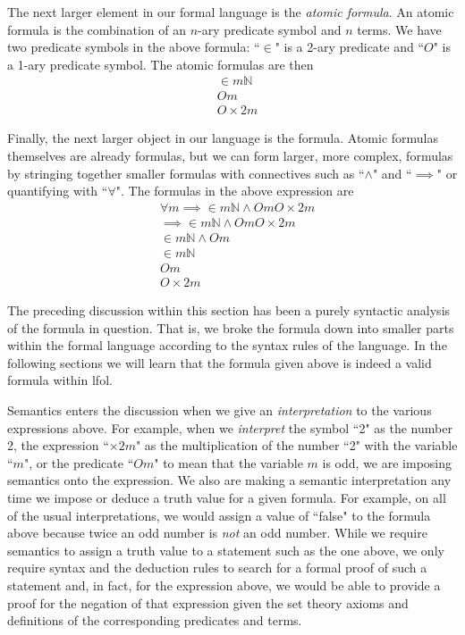 \documentclass[oneside, 12pt]{book}
\theoremstyle{break}
\newtheorem{preformal definition}[definition]{Preformal Definition}
\newtheorem{preformal theorem}[theorem]{Preformal Theorem}
\newcommand{\qq}[1]{``#1"}
\begin{document}
			The next larger element in our formal language is the \textit{atomic formula}.
			An atomic formula is the combination of an $n$-ary predicate symbol and $n$ terms.
			We have two predicate symbols in the above formula: \qq{$\in$} is a 2-ary predicate and \qq{$O$} is a 1-ary predicate symbol.
			The atomic formulas are then
			\begin{align*}
				&\in m \mathbb{N}\\
				&Om\\
				&O\times 2 m
			\end{align*}
			
			Finally, the next larger object in our language is the formula.
			Atomic formulas themselves are already formulas, but we can form larger, more complex, formulas by stringing together smaller formulas with connectives such as \qq{$\land$} and \qq{$\implies$} or quantifying with \qq{$\forall$}.
			The formulas in the above expression are
			\begin{align*}
				&\forall m\implies \in m \mathbb{N} \land Om O\times 2 m\\
				&\implies \in m \mathbb{N} \land Om O\times 2 m\\
				&\in m\mathbb{N} \land Om\\
				&\in m \mathbb{N}\\
				&Om\\
				&O\times 2 m
			\end{align*}
			
			The preceding discussion within this section has been a purely syntactic analysis of the formula in question.
			That is, we broke the formula down into smaller parts within the formal language according to the syntax rules of the language.
			In the following sections we will learn that the formula given above is indeed a valid formula within \gls{lfol}.
			
			Semantics enters the discussion when we give an \textit{interpretation} to the various expressions above.
			For example, when we \textit{interpret} the symbol \qq{2} as the number 2, the expression \qq{$\times 2 m$} as the multiplication of the number \qq{2} with the variable \qq{$m$}, or the predicate \qq{$Om$} to mean that the variable $m$ is odd, we are imposing semantics onto the expression.
			We also are making a semantic interpretation any time we impose or deduce a truth value for a given formula.
			For example, on all of the usual interpretations, we would assign a value of \qq{false} to the formula above because twice an odd number is \textit{not} an odd number.
			While we require semantics to assign a truth value to a statement such as the one above, we only require syntax and the deduction rules to search for a formal proof of such a statement and, in fact, for the expression above, we would be able to provide a proof for the negation of that expression given the set theory axioms and definitions of the corresponding predicates and terms.
			
\end{document}
